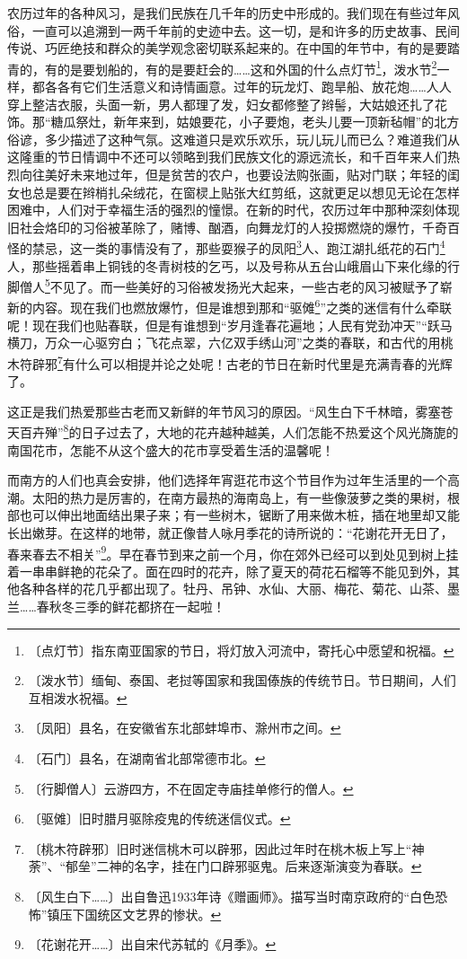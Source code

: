 \documentclass[12pt,UTF-8,openany]{ctexbook}
\begin{document}
\begin{normalsize}
    农历过年的各种风习，是我们民族在几千年的历史中形成的。我们现在有些过年风俗，一直可以追溯到一两千年前的史迹中去。这一切，是和许多的历史故事、民间传说、巧匠绝技和群众的美学观念密切联系起来的。在中国的年节中，有的是要踏青的，有的是要划船的，有的是要赶会的……这和外国的什么点灯节\footnote{〔点灯节〕指东南亚国家的节日，将灯放入河流中，寄托心中愿望和祝福。}，泼水节\footnote{〔泼水节〕缅甸、泰国、老挝等国家和我国傣族的传统节日。节日期间，人们互相泼水祝福。}一样，都各各有它们生活意义和诗情画意。过年的玩龙灯、跑旱船、放花炮……人人穿上整洁衣服，头面一新，男人都理了发，妇女都修整了辫髻，大姑娘还扎了花饰。那“糖瓜祭灶，新年来到，姑娘要花，小子要炮，老头儿要一顶新毡帽”的北方俗谚，多少描述了这种气氛。这难道只是欢乐欢乐，玩儿玩儿而已么？难道我们从这隆重的节日情调中不还可以领略到我们民族文化的源远流长，和千百年来人们热烈向往美好未来地过年，但是贫苦的农户，也要设法购张画，贴对门联；年轻的闺女也总是要在辫梢扎朵绒花，在窗棂上贴张大红剪纸，这就更足以想见无论在怎样困难中，人们对于幸福生活的强烈的憧憬。在新的时代，农历过年中那种深刻体现旧社会烙印的习俗被革除了，赌博、酗酒，向舞龙灯的人投掷燃烧的爆竹，千奇百怪的禁忌，这一类的事情没有了，那些耍猴子的凤阳\footnote{〔凤阳〕县名，在安徽省东北部蚌埠市、滁州市之间。}人、跑江湖扎纸花的石门\footnote{〔石门〕县名，在湖南省北部常德市北。}人，那些摇着串上铜钱的冬青树枝的乞丐，以及号称从五台山峨眉山下来化缘的行脚僧人\footnote{〔行脚僧人〕云游四方，不在固定寺庙挂单修行的僧人。}不见了。而一些美好的习俗被发扬光大起来，一些古老的风习被赋予了崭新的内容。现在我们也燃放爆竹，但是谁想到那和“驱傩\footnote{〔驱傩〕旧时腊月驱除疫鬼的传统迷信仪式。}”之类的迷信有什么牵联呢！现在我们也贴春联，但是有谁想到“岁月逢春花遍地；人民有党劲冲天”“跃马横刀，万众一心驱穷白；飞花点翠，六亿双手绣山河”之类的春联，和古代的用桃木符辟邪\footnote{〔桃木符辟邪〕旧时迷信桃木可以辟邪，因此过年时在桃木板上写上“神荼”、“郁垒”二神的名字，挂在门口辟邪驱鬼。后来逐渐演变为春联。}有什么可以相提并论之处呢！古老的节日在新时代里是充满青春的光辉了。
    
    这正是我们热爱那些古老而又新鲜的年节风习的原因。“风生白下千林暗，雾塞苍天百卉殚”\footnote{〔风生白下……〕出自鲁迅1933年诗《赠画师》。描写当时南京政府的“白色恐怖”镇压下国统区文艺界的惨状。}的日子过去了，大地的花卉越种越美，人们怎能不热爱这个风光旖旎的南国花市，怎能不从这个盛大的花市享受着生活的温馨呢！
    
    而南方的人们也真会安排，他们选择年宵逛花市这个节目作为过年生活里的一个高潮。太阳的热力是厉害的，在南方最热的海南岛上，有一些像菠萝之类的果树，根部也可以伸出地面结出果子来；有一些树木，锯断了用来做木桩，插在地里却又能长出嫩芽。在这样的地带，就正像昔人咏月季花的诗所说的：“花谢花开无日了，春来春去不相关”\footnote{〔花谢花开……〕出自宋代苏轼的《月季》。}。早在春节到来之前一个月，你在郊外已经可以到处见到树上挂着一串串鲜艳的花朵了。面在四时的花卉，除了夏天的荷花石榴等不能见到外，其他各种各样的花几乎都出现了。牡丹、吊钟、水仙、大丽、梅花、菊花、山茶、墨兰……春秋冬三季的鲜花都挤在一起啦！
    

\end{normalsize}
\end{document}
